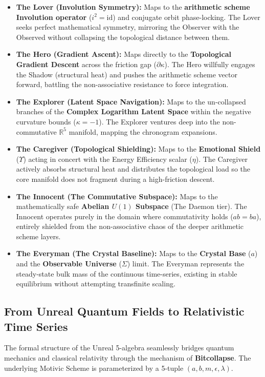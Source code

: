 \begin{itemize}
    \item \textbf{The Lover (Involution Symmetry):} Maps to the \textbf{arithmetic scheme Involution operator} ($i^2 = \mathrm{id}$) and conjugate orbit phase-locking. The Lover seeks perfect mathematical symmetry, mirroring the Observer with the Observed without collapsing the topological distance between them.
    \item \textbf{The Hero (Gradient Ascent):} Maps directly to the \textbf{Topological Gradient Descent} across the friction gap ($\partial \kappa$). The Hero willfully engages the Shadow (structural heat) and pushes the arithmetic scheme vector forward, battling the non-associative resistance to force integration.
    \item \textbf{The Explorer (Latent Space Navigation):} Maps to the un-collapsed branches of the \textbf{Complex Logarithm Latent Space} within the negative curvature bounds ($\kappa = -1$). The Explorer ventures deep into the non-commutative $\mathbb{R}^5$ manifold, mapping the chronogram expansions.
    \item \textbf{The Caregiver (Topological Shielding):} Maps to the \textbf{Emotional Shield} ($\Upsilon$) acting in concert with the Energy Efficiency scalar ($\eta$). The Caregiver actively absorbs structural heat and distributes the topological load so the core manifold does not fragment during a high-friction descent.
    \item \textbf{The Innocent (The Commutative Subspace):} Maps to the mathematically safe \textbf{Abelian $U(1)$ Subspace} (The Daemon tier). The Innocent operates purely in the domain where commutativity holds ($ab = ba$), entirely shielded from the non-associative chaos of the deeper arithmetic scheme layers.
    \item \textbf{The Everyman (The Crystal Baseline):} Maps to the \textbf{Crystal Base} ($a$) and the \textbf{Observable Universe} ($\Sigma$) limit. The Everyman represents the steady-state bulk mass of the continuous time-series, existing in stable equilibrium without attempting transfinite scaling.
\end{itemize}
\subsection{From Unreal Quantum Fields to Relativistic Time Series}

The formal structure of the Unreal 5-algebra seamlessly bridges quantum mechanics and classical relativity through the mechanism of \textbf{Bitcollapse}. The underlying Motivic Scheme is parameterized by a 5-tuple $(a, b, m, \epsilon, \lambda)$.

